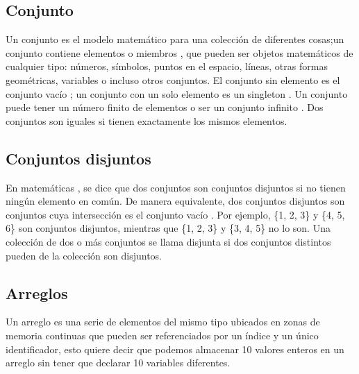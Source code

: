\subsection{Conjunto} 
Un conjunto es el modelo matemático para una colección de diferentes  cosas;un conjunto contiene elementos o miembros , que pueden ser objetos matemáticos de cualquier tipo: números, símbolos, puntos en el espacio, líneas, otras formas geométricas, variables o incluso otros conjuntos.  El conjunto sin elemento es el conjunto vacío ; un conjunto con un solo elemento es un singleton . Un conjunto puede tener un número finito de elementos o ser un conjunto infinito . Dos conjuntos son iguales si tienen exactamente los mismos elementos.

\subsection{Conjuntos disjuntos}

En matemáticas , se dice que dos conjuntos son conjuntos disjuntos si no tienen ningún elemento en común. De manera equivalente, dos conjuntos disjuntos son conjuntos cuya intersección es el conjunto vacío .  Por ejemplo, \{1, 2, 3\} y \{4, 5, 6\} son conjuntos disjuntos, mientras que \{1, 2, 3\} y \{3, 4, 5\} no lo son. Una colección de dos o más conjuntos se llama disjunta si dos conjuntos distintos pueden de la colección son disjuntos.

\subsection{Arreglos}
Un arreglo es una serie de elementos del mismo tipo ubicados en zonas de memoria
continuas que pueden ser referenciados por un índice y un único identificador, esto quiere
decir que podemos almacenar 10 valores enteros en un arreglo sin tener que declarar 10
variables diferentes.